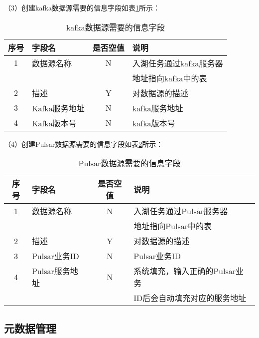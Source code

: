 （3）创建kafka数据源需要的信息字段如表\ref{tab:kafka数据源需要的信息字段}所示：

\begin{table}[H]
  \centering
  \caption{kafka数据源需要的信息字段}
  \label{tab:kafka数据源需要的信息字段}
  \begin{tabular}{clcl}
    \toprule
    序号  & 字段名     & 是否空值   & 说明                                      \\
    \midrule
    1    & 数据源名称  & N        & 入湖任务通过kafka服务器  \\
         &           &          &  地址指向kafka中的表 \\
    2    & 描述       & Y        & 对数据源的描述                               \\
    3    & Kafka服务地址    & N        & kafka服务地址                           \\
    4    & Kafka版本号      & N        &  kafka版本号       \\
    \bottomrule
  \end{tabular}
\end{table}

（4）创建Pulsar数据源需要的信息字段如表\ref{tab:Pulsar数据源需要的信息字段}所示：

\begin{table}[H]
  \centering
  \caption{Pulsar数据源需要的信息字段}
  \label{tab:Pulsar数据源需要的信息字段}
  \begin{tabular}{clcl}
    \toprule
    序号  & 字段名     & 是否空值   & 说明                                      \\
    \midrule
    1    & 数据源名称  & N        & 入湖任务通过Pulsar服务器 \\
         &           &          &  地址指向Pulsar中的表 \\
    2    & 描述       & Y        & 对数据源的描述                               \\
    3    & Pulsar业务ID    & N        & Pulsar业务ID                          \\
    4    & Pulsar服务地址      & N        &  系统填充，输入正确的Pulsar业务   \\
         &                    &         &  ID后会自动填充对应的服务地址      \\
    \bottomrule
  \end{tabular}
\end{table}

\subsection{元数据管理}

